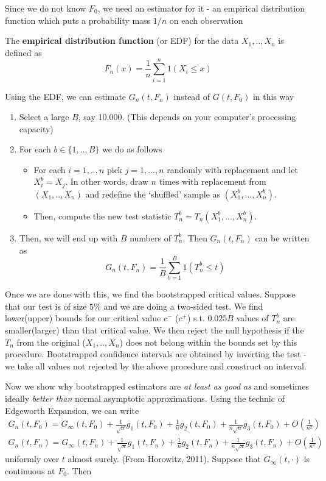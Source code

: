 Since we do not know $F_0$, we need an estimator for it - an empirical distribution function which puts a probability mass $1/n$ on each observation
\begin{mdframed}[backgroundcolor=blue!5] 
\begin{definition} The \textbf{empirical distribution function} (or EDF) for the data $X_1,..,X_n$ is defined as
\[
F_n(x) = \frac{1}{n}\sum_{i=1}^n 1(X_i\leq x)
\]
\end{definition}
\end{mdframed} 
Using the EDF, we can estimate $G_n(t, F_n)$ instead of $G(t,F_0)$ in this way
\begin{enumerate}
\item Select a large $B$, say 10,000. (This depends on your computer's processing capacity)
\item For each $b\in\{1,..,B\}$ we do as follows
\begin{itemize}
\item For each $i=1,..,n$ pick $j=1,...,n$ randomly with replacement and let $X_i^b= X_j$. In other words, draw $n$ times with replacement from $(X_1,..,X_n)$ and redefine the `shuffled' sample as $(X_1^b,...,X_n^b)$. 
\item Then, compute the new test statistic $T_n^b=T_n(X_1^b,...,X_n^b)$. 
\end{itemize}
\item Then, we will end up with $B$ numbers of $T_n^b$. Then $G_n(t,F_n)$ can be written as
\[
G_n(t,F_n) = \frac{1}{B}\sum_{b=1}^B 1(T_n^b\leq t)
\]
\end{enumerate}\par
Once we are done with this, we find the bootstrapped critical values. Suppose that our test is of size $5\%$ and we are doing a two-sided test. We find lower(upper) bounds for our critical value $c^-$ ($c^+$) s.t. $0.025B$ values of $T_n^b$ are smaller(larger) than that critical value. We then reject the null hypothesis if the $T_n$ from the original ($X_1,..,X_n$) does not belong within the bounds set by this procedure. Bootstrapped confidence intervals are obtained by inverting the test - we take all values not rejected by the above procedure and construct an interval. \par
Now we show why bootstrapped estimators are \textit{at least as good as} and sometimes ideally \textit{better than} normal asymptotic approximations. Using the technic of Edgeworth Expansion, we can write
\begin{gather*}
G_n(t,F_0)=G_\infty(t,F_0) +\frac{1}{\sqrt{n}}g_1(t,F_0)+\frac{1}{n}g_2(t,F_0)+\frac{1}{n\sqrt{n}}g_3(t,F_0)+O\left(\frac{1}{n^2}\right)\\
G_n(t,F_n)=G_\infty(t,F_n) +\frac{1}{\sqrt{n}}g_1(t,F_n)+\frac{1}{n}g_2(t,F_n)+\frac{1}{n\sqrt{n}}g_3(t,F_n)+O\left(\frac{1}{n^2}\right)
\end{gather*}uniformly over $t$ almost surely. (From Horowitz, 2011). Suppose that $G_\infty(t,\cdot)$ is continuous at $F_0$. Then
